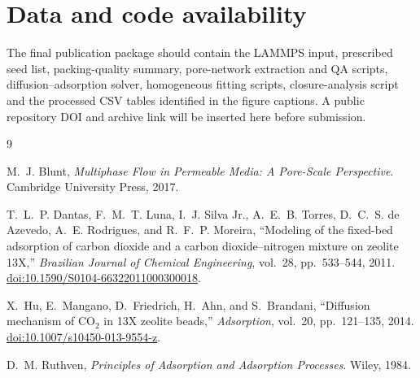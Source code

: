 \documentclass[11pt,a4paper]{article}
\begin{document}
\section*{Data and code availability}

The final publication package should contain the LAMMPS input, prescribed seed
list, packing-quality summary, pore-network extraction and QA scripts,
diffusion--adsorption solver, homogeneous fitting scripts, closure-analysis
script and the processed CSV tables identified in the figure captions. A
public repository DOI and archive link will be inserted here before submission.

\begin{thebibliography}{9}
\small

M.~J. Blunt,
\emph{Multiphase Flow in Permeable Media: A Pore-Scale Perspective}.
Cambridge University Press, 2017.

T.~L.~P. Dantas, F.~M.~T. Luna, I.~J. Silva Jr., A.~E.~B. Torres,
D.~C.~S. de Azevedo, A.~E. Rodrigues, and R.~F.~P. Moreira,
``Modeling of the fixed-bed adsorption of carbon dioxide and a carbon
dioxide--nitrogen mixture on zeolite 13X,''
\emph{Brazilian Journal of Chemical Engineering}, vol.~28, pp.~533--544, 2011.
\href{https://doi.org/10.1590/S0104-66322011000300018}{doi:10.1590/S0104-66322011000300018}.

X.~Hu, E.~Mangano, D.~Friedrich, H.~Ahn, and S.~Brandani,
``Diffusion mechanism of CO$_2$ in 13X zeolite beads,''
\emph{Adsorption}, vol.~20, pp.~121--135, 2014.
\href{https://doi.org/10.1007/s10450-013-9554-z}{doi:10.1007/s10450-013-9554-z}.

D.~M. Ruthven,
\emph{Principles of Adsorption and Adsorption Processes}.
Wiley, 1984.

\end{thebibliography}
\end{document}
